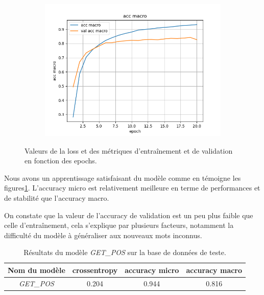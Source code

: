 \documentclass[a4paper]{article}
\begin{document}
\begin{figure}[H]
\begin{subfigure}{0.32\textwidth}
    \end{subfigure}
    \begin{subfigure}{0.32\textwidth}
        \centering
        \includegraphics[width=\linewidth]{../logs/get_pos/acc macro.png}
    \end{subfigure}
    \caption{Valeurs de la loss et des métriques d'entraînement et de validation en fonction des epochs.}
    \label{fig: lstm}
\end{figure}

Nous avons un apprentissage satisfaisant du modèle comme en témoigne les figures\ref{fig: lstm}. 
L'accuracy micro est relativement meilleure en terme de performances et de stabilité que l'accuracy macro.

On constate que la valeur de l'accuracy de validation est un peu plus faible que celle d'entraînement, cela 
s'explique par plusieurs facteurs, notamment la difficulté du modèle à généraliser aux nouveaux mots inconnus.


\begin{table}[H]
    \centering
    \begin{tabular}{|c|c|c|c|}
        \hline
        Nom du modèle & crossentropy & accuracy micro & accuracy macro \\
        \hline
        \textit{GET\_POS} & 0.204 & 0.944 & 0.816\\
        \hline
    \end{tabular}
    \caption{Résultats du modèle \textit{GET\_POS} sur la base de données de teste.}
    \label{tab:test getpos}
\end{table}
\end{document}
